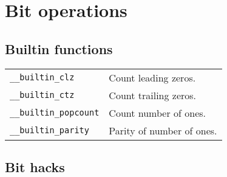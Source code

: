 \section{Bit operations}
\subsection{Builtin functions}
\begin{tabularx}{\linewidth}{lX}
    \texttt{\_\_builtin\_clz} & Count leading zeros.\\
    \texttt{\_\_builtin\_ctz} & Count trailing zeros.\\
    \texttt{\_\_builtin\_popcount} & Count number of ones.\\
    \texttt{\_\_builtin\_parity} & Parity of number of ones.\\
\end{tabularx}

\subsection*{Bit hacks}